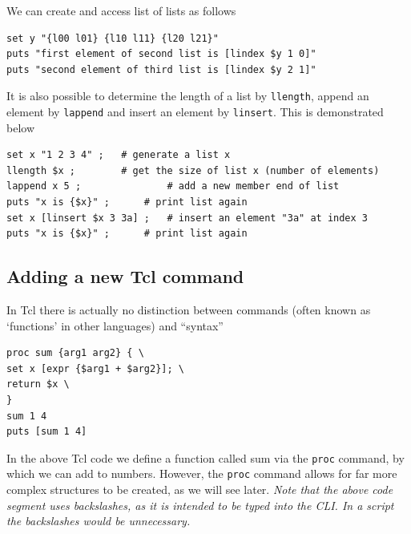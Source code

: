 \documentclass[
paper=a4,                       %
fontsize=11pt,                  %
twoside,                        %
footsepline,                    %
headsepline,                    %
headinclude=false,              %
footinclude=false,              %
pagesize,                       %
]{scrartcl}
\begin{document}
\noindent We can create and access list of lists as follows

{\small\vspace{0,2cm}
\begin{lstlisting}[numbers=none]
set y "{l00 l01} {l10 l11} {l20 l21}"
puts "first element of second list is [lindex $y 1 0]"
puts "second element of third list is [lindex $y 2 1]"
\end{lstlisting}\vspace{0,2cm}
}

\noindent It is also possible to determine the length of a list by \lstinline|llength|, append an element by \lstinline|lappend| and insert an element by \lstinline|linsert|. This is demonstrated below
       
{\small\vspace{0,2cm}
\begin{lstlisting}[numbers=none]
set x "1 2 3 4" ; 	# generate a list x
llength $x ;		# get the size of list x (number of elements)
lappend x 5 ;		        # add a new member end of list
puts "x is {$x}" ;		# print list again
set x [linsert $x 3 3a] ;	# insert an element "3a" at index 3
puts "x is {$x}" ;		# print list again
\end{lstlisting}\vspace{0,2cm}
}

\subsection{Adding a new Tcl command}
     
In Tcl there is actually no distinction between commands (often known as `functions' in other languages) and ``syntax''~\cite{tcl_tut_url}

{\small\vspace{0,2cm}
\begin{lstlisting}[numbers=none]
proc sum {arg1 arg2} { \
set x [expr {$arg1 + $arg2}]; \
return $x \
} 
sum 1 4
puts [sum 1 4]
\end{lstlisting}\vspace{0,2cm}
}

%

In the above Tcl code we define a function called sum via the \lstinline|proc| command, by which we can add to numbers. However, the \lstinline|proc| command allows for far more complex structures to be created, as we will see later. \emph{Note that the above code segment uses backslashes, as it is intended to be typed into the \es{} CLI. In a script the backslashes would be unnecessary.} 
\end{document}
